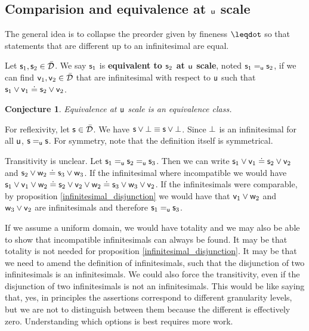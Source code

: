 \documentclass[10pt, onecolumn, nofootinbib]{revtex4-1}
\newtheorem{conj}[equation]{Conjecture}
\begin{document}
\subsection{Comparision and equivalence at $\stmt[u]$ scale}

The general idea is to collapse the preorder given by fineness $\finer$ so that statements that are different up to an infinitesimal are equal.

\def\equivu{\cong_{\stmt[u]}}

\begin{defn}
	Let $\stmt_1, \stmt_2 \in \tdomain$. We say $\stmt_1$ is \textbf{equivalent to $\stmt_2$ at $\stmt[u]$ scale}, noted $\stmt_1 \equ \stmt_2$, if we can find $\stmt[v]_1, \stmt[v]_2 \in \tdomain$ that are infinitesimal with respect to $\stmt[u]$ such that $\stmt_1 \OR \stmt[v]_1 \eqgran \stmt_2 \OR \stmt[v]_2$.
\end{defn}

\begin{conj}
	Equivalence at $\stmt[u]$ scale is an equivalence class.
\end{conj}

\begin{remark}
	For reflexivity, let $\stmt \in \tdomain$. We have $\stmt \OR \impossibility \equiv \stmt \OR \impossibility$. Since $\impossibility$ is an infinitesimal for all $\stmt[u]$, $\stmt \equ \stmt$. For symmetry, note that the definition itself is symmetrical.
	
	Transitivity is unclear. Let $\stmt_1 \equ \stmt_2 \equ \stmt_3$. Then we can write $\stmt_1 \OR \stmt[v]_1 \eqgran \stmt_2 \OR \stmt[v]_2$ and $\stmt_2 \OR \stmt[w]_2 \eqgran \stmt_3 \OR \stmt[w]_3$. If the infinitesimal where incompatible we would have $\stmt_1 \OR \stmt[v]_1 \OR \stmt[w]_2 \eqgran \stmt_2 \OR \stmt[v]_2 \OR \stmt[w]_2 \eqgran \stmt_3 \OR \stmt[w]_3 \OR \stmt[v]_2$. If the infinitesimals were comparable, by proposition \ref{infinitesimal_disjunction} we would have that $\stmt[v]_1 \OR \stmt[w]_2$ and $\stmt[w]_3 \OR \stmt[v]_2$ are infinitesimals and therefore $\stmt_1 \equ \stmt_3$.
	
	If we assume a uniform domain, we would have totality and we may also be able to show that incompatible infinitesimals can always be found. It may be that totality is not needed for proposition \ref{infinitesimal_disjunction}. It may be that we need to amend the definition of infinitesimals, such that the disjunction of two infinitesimals is an infinitesimals. We could also force the transitivity, even if the disjunction of two infinitesimals is not an infinitesimals. This would be like saying that, yes, in principles the assertions correspond to different granularity levels, but we are not to distinguish between them because the different is effectively zero. Understanding which options is best requires more work.
\end{remark}
\end{document}
